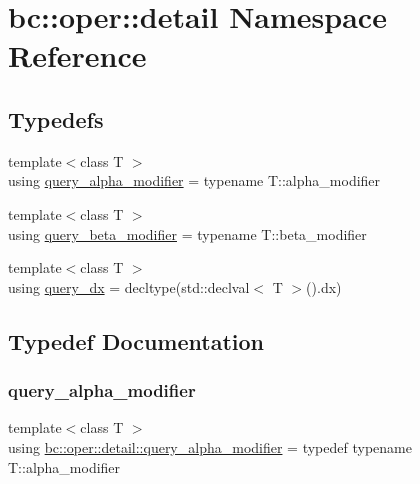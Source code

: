 \hypertarget{namespacebc_1_1oper_1_1detail}{}\section{bc\+:\+:oper\+:\+:detail Namespace Reference}
\label{namespacebc_1_1oper_1_1detail}
\subsection*{Typedefs}
\begin{DoxyCompactItemize}
\item 
{\footnotesize template$<$class T $>$ }\\using \hyperlink{namespacebc_1_1oper_1_1detail_a5fe5a0f1d0c660f34cb4f975ad4d29bf}{query\+\_\+alpha\+\_\+modifier} = typename T\+::alpha\+\_\+modifier
\item 
{\footnotesize template$<$class T $>$ }\\using \hyperlink{namespacebc_1_1oper_1_1detail_abb9645396fc587030351c50ca6b427e2}{query\+\_\+beta\+\_\+modifier} = typename T\+::beta\+\_\+modifier
\item 
{\footnotesize template$<$class T $>$ }\\using \hyperlink{namespacebc_1_1oper_1_1detail_a645b64273216ac6f751a3027610957a6}{query\+\_\+dx} = decltype(std\+::declval$<$ T $>$().dx)
\end{DoxyCompactItemize}


\subsection{Typedef Documentation}
\mbox{\label{namespacebc_1_1oper_1_1detail_a5fe5a0f1d0c660f34cb4f975ad4d29bf}} 
\subsubsection{\texorpdfstring{query\+\_\+alpha\+\_\+modifier}{query\_alpha\_modifier}}
{\footnotesize\ttfamily template$<$class T $>$ \\
using \hyperlink{namespacebc_1_1oper_1_1detail_a5fe5a0f1d0c660f34cb4f975ad4d29bf}{bc\+::oper\+::detail\+::query\+\_\+alpha\+\_\+modifier} = typedef typename T\+::alpha\+\_\+modifier}

